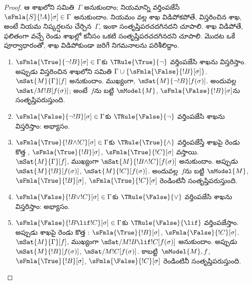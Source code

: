 \documentclass[../../../include/open-logic-section]{subfiles}
\begin{document}
\begin{proof}
ఆ శాఖలోని 
సమితి~$\Gamma$ అనుకుందాం; నియమాన్ని వర్తింపజేసే
~$\sFmla{S}{!A}[\sigma] \in \Gamma$
అనుకుందాం. నియమం వల్ల శాఖ విడిపోకపోతే, విస్తరించిన
శాఖ, అంటే నియమ నిష్కర్షలను చేర్చిన~$\Gamma$, ఇంకా
సంతృప్తిపరచదగినదని చూపాలి. శాఖ విడిపోతే, ఫలితంగా
వచ్చే రెండు శాఖల్లో కనీసం ఒకటి సంతృప్తిపరచదగినదని
చూపాలి.
మొదట ఒకే పూర్వాధారంతో, శాఖ విడిపోకుండా జరిగే నిగమనాలను పరిశీలిద్దాం.
\begin{enumerate}
\item $\sFmla{\True}{\lnot !B}[\sigma] \in \Gamma$కు
  $\TRule{\True}{\lnot}$ వర్తింపజేసి శాఖను విస్తరిస్తాం.
  అప్పుడు విస్తరించిన శాఖలోని 
  సమితి $\Gamma \cup \{\sFmla{\False}{!B}[\sigma]\}$.
  $\mSat{M}{\Gamma}[f]$ అనుకుందాం. ముఖ్యంగా,
  $\mSat{M}{\lnot !B}[f(\sigma)]$. అందువల్ల
  $\mSat/{M}{!B}[f(\sigma)]$; అంటే~$f$ను బట్టి $\mModel{M}$,
  $\sFmla{\False}{!B}[\sigma]$ను సంతృప్తిపరుస్తుంది.
\item $\sFmla{\False}{\lnot !B}[\sigma] \in \Gamma$కు
  $\TRule{\False}{\lnot}$ వర్తింపజేసి శాఖను విస్తరిస్తాం:
  అభ్యాసం.
\item $\sFmla{\True}{!B \land !C}[\sigma] \in \Gamma$కు
  $\TRule{\True}{\land}$ వర్తింపజేస్తే శాఖపై రెండు కొత్త
  ,
  $\sFmla{\True}{!B}[\sigma]$, $\sFmla{\True}{!C}[\sigma]$ వస్తాయి.
  $\mSat{M}{\Gamma}[f]$, ముఖ్యంగా $\mSat{M}{!B \land
    !C}[f(\sigma)]$ అనుకుందాం. అప్పుడు $\mSat{M}{!B}[f(\sigma)]$,
  $\mSat{M}{!C}[f(\sigma)]$. అందువల్ల~$f$ను బట్టి $\mModel{M}$,
  $\sFmla{\True}{!B}[\sigma]$, $\sFmla{\True}{!C}[\sigma]$
  రెండింటినీ సంతృప్తిపరుస్తుంది.
\item $\sFmla{\False}{!B \lor !C}[\sigma] \in \Gamma$కు
  $\TRule{\False}{\lor}$ వర్తింపజేసి శాఖను విస్తరిస్తాం:
  అభ్యాసం.
\item $\sFmla{\False}{!B \lif !C}[\sigma] \in \Gamma$కు
  $\TRule{\False}{\lif}$ వర్తింపజేస్తాం. అప్పుడు శాఖపై
  రెండు కొత్త :
  $\sFmla{\True}{!B}[\sigma]$, $\sFmla{\False}{!C}[\sigma]$.
  $\mSat{M}{\Gamma}[f]$, ముఖ్యంగా
  $\mSat/{M}{!B \lif !C}[f(\sigma)]$ అనుకుందాం. అప్పుడు
  $\mSat{M}{!B}[f(\sigma)]$, $\mSat/{M}{!C}[f(\sigma)]$.
  కాబట్టి~$\mModel{M}, f$, $\sFmla{\True}{!B}[\sigma]$,
  $\sFmla{\False}{!C}[\sigma]$ రెండింటినీ సంతృప్తిపరుస్తుంది.

\end{enumerate}
\end{proof}
\end{document}
